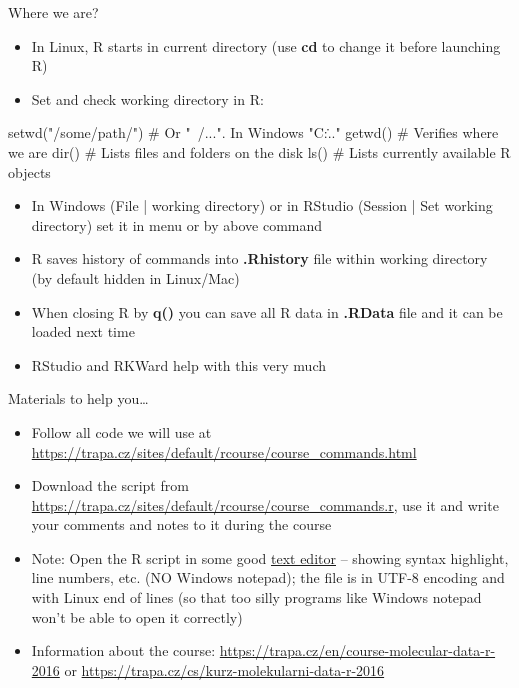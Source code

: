 \documentclass[compress, ucs, xelatex, 11pt, xcolor=svgnames,
  hyperref={
    bookmarks=true,
    unicode=true,
    colorlinks=true,
    pdftitle={Molecular data in R},
    plainpages=false,
    pdfauthor={Vojtech Zeisek},
    pdfsubject={Course about phylogeny and evolution in R},
    pdfcreator={XeLaTeX},
    pdfkeywords={R, evolution, phylogeny, molecular data},
    linkcolor=Tomato,
    anchorcolor=SaddleBrown,
    citecolor=Goldenrod,
    filecolor=DarkMagenta,
    menucolor=Sienna,
    urlcolor=DarkTurquoise,
    pdftex},
  url={hyphens, lowtilde} %
  ]{beamer}
\begin{document}
\begin{frame}[fragile]{Where we are?}
\begin{itemize}
 \item In Linux, R starts in current directory (use \textbf{cd} to change it before launching R)
 \item Set and check working directory in R:
\end{itemize}
  \begin{spluscode}
    setwd("/some/path/") # Or "~/...". In Windows "C:\..."
    getwd() # Verifies where we are
    dir() # Lists files and folders on the disk
    ls() # Lists currently available R objects
  \end{spluscode}
\begin{itemize}
 \item In Windows (File | working directory) or in RStudio (Session | Set working directory) set it in menu or by above command
 \item R saves history of commands into \textbf{.Rhistory} file within working directory (by default hidden in Linux/Mac)
 \item When closing R by \textbf{q()} you can save all R data in \textbf{.RData} file and it can be loaded next time
 \item RStudio and RKWard help with this very much
\end{itemize}
\end{frame}

\begin{frame}{Materials to help you\ldots}
\begin{itemize}
 \item Follow all code we will use at \url{https://trapa.cz/sites/default/rcourse/course_commands.html}
 \item Download the script from \url{https://trapa.cz/sites/default/rcourse/course_commands.r}, use it and write your comments and notes to it during the course
 \item \alert{Note:} Open the R script in some \alert{good} \href{http://texteditors.org/cgi-bin/wiki.pl?PickingATextEditor}{text editor} -- showing syntax highlight, line numbers, etc. (\alert{NO} Windows notepad); the file is in UTF-8 encoding and with Linux end of lines (so that too silly programs like Windows notepad won't be able to open it correctly)
 \item Information about the course: \url{https://trapa.cz/en/course-molecular-data-r-2016} or \url{https://trapa.cz/cs/kurz-molekularni-data-r-2016}
\end{itemize}
\end{frame}
\end{document}
